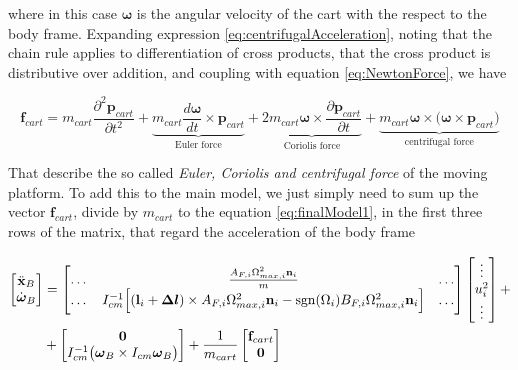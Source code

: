 \noindent where in this case $\boldsymbol{\omega}$ is the angular velocity of the cart with the respect to the body frame. Expanding expression \eqref{eq:centrifugalAcceleration}, noting that the chain rule applies to differentiation of cross products, that the cross product is distributive over addition, and coupling with equation \eqref{eq:NewtonForce}, we have

\begin{equation}
	\mathbf{f}_{cart}=m_{cart}\frac{\partial^2\mathbf{p}_{cart}}{\partial t^2}+\underbrace{m_{cart}\frac{d\boldsymbol{\omega}}{dt}\times\mathbf{p}_{cart}}_{\text{Euler force}}+\underbrace{2m_{cart}\boldsymbol{\omega}\times\frac{\partial\mathbf{p}_{cart}}{\partial t}}_{\text{Coriolis force}}+\underbrace{m_{cart}\boldsymbol{\omega}\times\bigl(\boldsymbol{\omega}\times\mathbf{p}_{cart}\bigl)}_{\text{centrifugal force}}
	\label{eq:cartAllForces}
\end{equation}

\noindent That describe the so called \textit{Euler, Coriolis and centrifugal force} of the moving platform. To add this to the main model, we just simply need to sum up the vector $\mathbf{f}_{cart}$, divide by $m_{cart}$ to the equation \eqref{eq:finalModel1}, in the first three rows of the matrix, that regard the acceleration of the body frame

\begin{equation}
	\begin{split}
		\begin{bmatrix}
			\ddot{\mathbf{x}}_B \\
			\dot{\boldsymbol{\omega}}_B
		\end{bmatrix}
		&=
		\begin{bmatrix}
			\dots & \frac{A_{F,i}\Omega_{max,i}^2\mathbf{n}_i}{m} & \dots \\
			\dots & I_{cm}^{-1}\Big[ (\mathbf{l}_i+\boldsymbol{\Delta l})\times A_{F,i}\Omega^2_{max,i}\mathbf{n}_i-\operatorname*{sgn}(\Omega_i)B_{F,i}\Omega_{max,i}^2\mathbf{n}_i\Big] & \dots
		\end{bmatrix}
		\begin{bmatrix}
			\vdots \\
			u_i^2 \\
			\vdots
		\end{bmatrix}
		+ \\
		&+
		\begin{bmatrix}
			\mathbf{0} \\
			I_{cm}^{-1}\bigl(\boldsymbol{\omega}_B \times I_{cm} \boldsymbol{\omega}_B \bigl)
		\end{bmatrix} 
		+
		\frac{1}{m_{cart}}
		\begin{bmatrix}
		\mathbf{f}_{cart} \\
		\mathbf{0}
		\end{bmatrix}
	\end{split}
	\label{eq:finalModelCart}
\end{equation}


